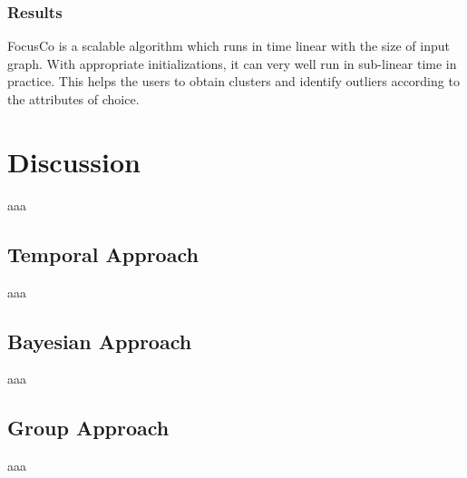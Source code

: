\documentclass[11pt, oneside]{article}   	%
\begin{document}
\subsubsection*{Results}

\quad FocusCo is a scalable algorithm which runs in time linear with the size of input graph.
With appropriate initializations, it can very well run in sub-linear time in practice.
This helps the users to obtain clusters and identify outliers according to the attributes of choice.

\section*{Discussion}

aaa

\subsection*{Temporal Approach}

aaa

\subsection*{Bayesian Approach}

aaa

\subsection*{Group Approach}

aaa
\end{document}
